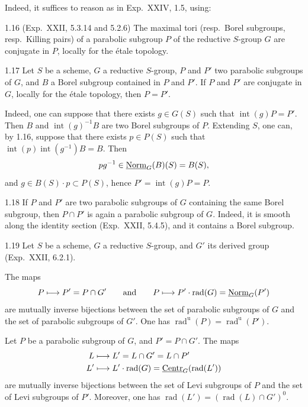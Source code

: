 Indeed, it suffices to reason as in Exp.~XXIV, 1.5, using:
\begin{lemma}{1.16 (Exp.~XXII, 5.3.14 and 5.2.6)}\label{XXVI.1.16}
The maximal tori (resp.~Borel subgroups, resp.~Killing pairs) of a parabolic subgroup $P$ of the reductive $S$-group $G$ are conjugate in $P$, locally for the \'etale topology.
\end{lemma}

\begin{proposition}{1.17}\label{XXVI.1.17}
Let $S$ be a scheme, $G$ a reductive $S$-group, $P$ and $P'$ two parabolic subgroups of $G$, and $B$ a Borel subgroup contained in $P$ and $P'$. If $P$ and $P'$ are conjugate in $G$, locally for the \'etale topology, then $P=P'$.
\end{proposition}
Indeed, one can suppose that there exists $g\in G(S)$ such that $\operatorname{int}(g)P=P'$. Then $B$ and $\operatorname{int}(g)^{-1}B$ are two Borel subgroups of $P$. Extending $S$, one can, by 1.16, suppose that there exists $p\in P(S)$ such that $\operatorname{int}(p)\operatorname{int}(g^{-1})B=B$. Then
\[
pg^{-1}\in\underline{\mathrm{Norm}}_G(B)(S)=B(S),
\]
and $g\in B(S)\cdot p\subset P(S)$, hence $P'=\operatorname{int}(g)P=P$.
\begin{remark}{1.18}\label{XXVI.1.18}
If $P$ and $P'$ are two parabolic subgroups of $G$ containing the same Borel subgroup, then $P\cap P'$ is again a parabolic subgroup of $G$. Indeed, it is smooth along the identity section (Exp.~XXII, 5.4.5), and it contains a Borel subgroup.
\end{remark}
\begin{proposition}{1.19}\label{XXVI.1.19}
Let $S$ be a scheme, $G$ a reductive $S$-group, and $G'$ its derived group (Exp.~XXII, 6.2.1).
\begin{enumeratei}
\item The maps
\[
P\longmapsto P'=P\cap G'\qquad\text{and}\qquad
P\longmapsto P'\cdot\operatorname{rad}(G)=\underline{\mathrm{Norm}}_G(P')
\]
are mutually inverse bijections between the set of parabolic subgroups of $G$ and the set of parabolic subgroups of $G'$. One has $\operatorname{rad}^{\mathrm u}(P)=\operatorname{rad}^{\mathrm u}(P')$.
\item Let $P$ be a parabolic subgroup of $G$, and $P'=P\cap G'$. The maps
\[
\begin{aligned}
L&\longmapsto L'=L\cap G'=L\cap P'\\
L'&\longmapsto L'\cdot\operatorname{rad}(G)=\underline{\mathrm{Centr}}_G(\operatorname{rad}(L'))
\end{aligned}
\]
are mutually inverse bijections between the set of Levi subgroups of $P$ and the set of Levi subgroups of $P'$. Moreover, one has $\operatorname{rad}(L')=(\operatorname{rad}(L)\cap G')^0$.
\end{enumeratei}
\end{proposition}
